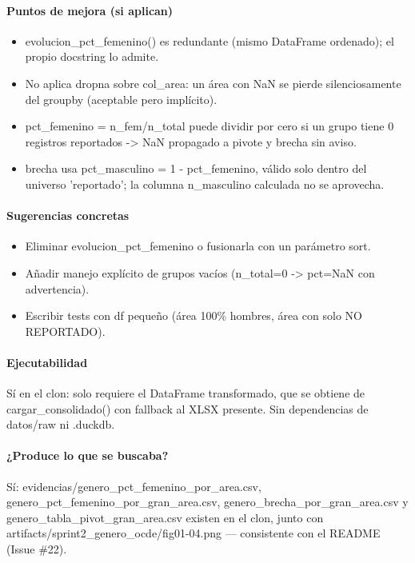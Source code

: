 \paragraph{Puntos de mejora (si aplican)}
\begin{itemize}
  \item evolucion\_pct\_femenino() es redundante (mismo DataFrame ordenado); el propio docstring lo admite.
  \item No aplica dropna sobre col\_area: un área con NaN se pierde silenciosamente del groupby (aceptable pero implícito).
  \item pct\_femenino = n\_fem/n\_total puede dividir por cero si un grupo tiene 0 registros reportados -> NaN propagado a pivote y brecha sin aviso.
  \item brecha usa pct\_masculino = 1 - pct\_femenino, válido solo dentro del universo 'reportado'; la columna n\_masculino calculada no se aprovecha.
\end{itemize}

\paragraph{Sugerencias concretas}
\begin{itemize}
  \item Eliminar evolucion\_pct\_femenino o fusionarla con un parámetro sort.
  \item Añadir manejo explícito de grupos vacíos (n\_total=0 -> pct=NaN con advertencia).
  \item Escribir tests con df pequeño (área 100\% hombres, área con solo NO REPORTADO).
\end{itemize}

\paragraph{Ejecutabilidad}
Sí en el clon: solo requiere el DataFrame transformado, que se obtiene de cargar\_consolidado() con fallback al XLSX presente. Sin dependencias de datos/raw ni .duckdb.

\paragraph{¿Produce lo que se buscaba?}
Sí: evidencias/genero\_pct\_femenino\_por\_area.csv, genero\_pct\_femenino\_por\_gran\_area.csv, genero\_brecha\_por\_gran\_area.csv y genero\_tabla\_pivot\_gran\_area.csv existen en el clon, junto con artifacts/sprint2\_genero\_ocde/fig01-04.png --- consistente con el README (Issue \#22).

